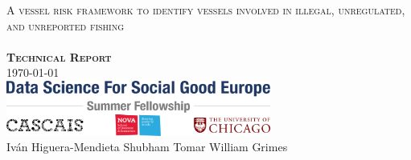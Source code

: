\documentclass[11pt, english]{article}
\begin{document}
\hypersetup{linkcolor=black}

\begin{titlepage}
\hypersetup{pageanchor=false}
    \begin{center}
        \vspace*{1cm}
        \huge
	\textsc{A vessel risk framework to identify vessels involved in illegal, unregulated, and unreported fishing} \\~\\
        \vspace{6cm}
        \huge
        \textbf{\textsc{Technical Report}} \\
        \vspace{6cm}
	\Large
        \today \\
        \vspace{1cm}
        \includegraphics[width=0.65\textwidth]{images/logo} \\
        \vfill
	\Large
	Iv\'{a}n Higuera-Mendieta \hfill Shubham Tomar  \hfill William Grimes \\
    \end{center}
\end{titlepage}

\hypersetup{pageanchor=true}

\begin{abstract}

\end{abstract}

\clearpage
\tableofcontents

\newpage


\clearpage  



\end{document}

